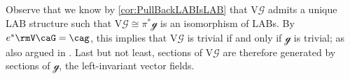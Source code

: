 \documentclass[reqno,a4paper,oneside]{amsart}
\newcommand\MC{\mu_{{\rm MC}}}
\theoremstyle{plain}
\theoremstyle{remark}
\newtheorem{remark}[theorem]{Remarks}
\theoremstyle{definition}
\def\bas#1\eas{\begin{align*}#1\end{align*}}
\begin{document}
Observe that we know by \ref{cor:PullBackLABIsLAB} that $\mathrm{V}\mathcal{G}$ admits a unique LAB structure such that $\mathrm{V}\mathcal{G} \cong \pi^*\mathcal{g}$ is an isomorphism of LABs. By $e^*\rmV\caG = \cag$, this implies that $\mathrm{V}\mathcal{G}$ is trivial if and only if $\mathcal{g}$ is trivial; as also argued in \cite[\S 3.5, discussion after Cor.\ 3.5.4, page 121]{mackenzieGeneralTheory}.
Last but not least, sections of $\mathrm{V}\mathcal{G}$ are therefore generated by sections of $\mathcal{g}$, the left-invariant vector fields.

\end{document}
